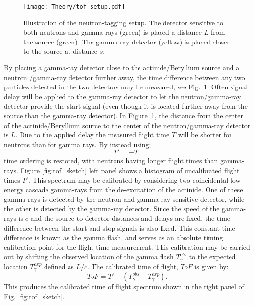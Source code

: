 \documentclass[main.tex]{subfiles}
\begin{document}
\begin{figure}[t]
    \centering
        \texttt{[image: Theory/tof\_setup.pdf]}
        \caption[Illustration of the neutron-tagging setup.]{Illustration of the neutron-tagging setup. The detector sensitive to both neutrons and gamma-rays (green) is placed a distance $L$ from the source (green). The gamma-ray detector (yellow) is placed closer to the source at distance $s$. }
    \label{fig:tof_setup} 
\end{figure}

By placing a gamma-ray detector close to the actinide/Beryllium source and a neutron /gamma-ray detector further away, the time difference between any two particles detected in the two detectors may be measured, see Fig.~\ref{fig:tof_setup}. Often signal delay will be applied to the gamma-ray detector to let the neutron/gamma-ray detector provide the start signal (even though it is located further away from the source than the gamma-ray detector).
In Figure~\ref{fig:tof_setup}, the distance from the center of the actinide/Beryllium source to the center of the neutron/gamma-ray detector is $L$.  Due to the applied delay the measured flight time $T$ will be shorter for neutrons than for gamma rays. By instead using;
\begin{equation}
T'=-T,
\end{equation}
time ordering is restored, with neutrons having longer flight times than gamma-rays. Figure \ref{fig:tof_sketch} left panel shows a histogram of uncalibrated flight times $T'$. This spectrum may be calibrated by considering two coincidental low-energy cascade gamma-rays from the de-excitation of the actinide. One of these gamma-rays is detected by the neutron and gamma-ray sensitive detector, while the other is detected by the gamma-ray detector. 
Since the speed of the gamma-rays is $c$ and the source-to-detector distances and delays are fixed, the time difference between the start and stop signals is also fixed. This constant time difference is known as the gamma flash, and serves as an absolute timing calibration point for the flight-time measurement.
This calibration may be carried out by shifting the observed location of the gamma flash $T_\gamma^{obs}$ to the expected location $T_\gamma^{exp}$ defined as $L/c$. The calibrated time of flight, $ToF$ is given by:
\begin{equation}
	ToF = T' -(T_\gamma^{obs} - T_\gamma^{exp}).
	\label{eq:tof_cal}
\end{equation}
This produces the calibrated time of flight spectrum shown in the right panel of Fig. \ref{fig:tof_sketch}.
\end{document}
